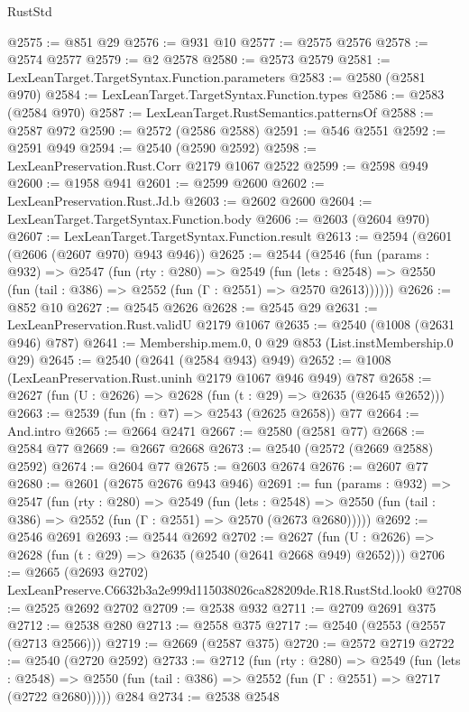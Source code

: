 \begin{lexlean}{RustStd}
\begin{coremodule}
@2575 := @851 @29
@2576 := @931 @10
@2577 := @2575 @2576
@2578 := @2574 @2577
@2579 := @2 @2578
@2580 := @2573 @2579
@2581 := LexLeanTarget.TargetSyntax.Function.parameters
@2583 := @2580 (@2581 @970)
@2584 := LexLeanTarget.TargetSyntax.Function.types
@2586 := @2583 (@2584 @970)
@2587 := LexLeanTarget.RustSemantics.patternsOf
@2588 := @2587 @972
@2590 := @2572 (@2586 @2588)
@2591 := @546 @2551
@2592 := @2591 @949
@2594 := @2540 (@2590 @2592)
@2598 := LexLeanPreservation.Rust.Corr @2179 @1067 @2522
@2599 := @2598 @949
@2600 := @1958 @941
@2601 := @2599 @2600
@2602 := LexLeanPreservation.Rust.Jd.b
@2603 := @2602 @2600
@2604 := LexLeanTarget.TargetSyntax.Function.body
@2606 := @2603 (@2604 @970)
@2607 := LexLeanTarget.TargetSyntax.Function.result
@2613 := @2594 (@2601 (@2606 (@2607 @970) @943 @946))
@2625 := @2544
    (@2546
      (fun (params : @932) =>
      @2547
        (fun (rty : @280) =>
        @2549
          (fun (lets : @2548) =>
          @2550 (fun (tail : @386) => @2552 (fun (Γ : @2551) => @2570 @2613))))))
@2626 := @852 @10
@2627 := @2545 @2626
@2628 := @2545 @29
@2631 := LexLeanPreservation.Rust.validU @2179 @1067
@2635 := @2540 (@1008 (@2631 @946) @787)
@2641 := Membership.mem.{0, 0} @29 @853 (List.instMembership.{0} @29)
@2645 := @2540 (@2641 (@2584 @943) @949)
@2652 := @1008 (LexLeanPreservation.Rust.uninh @2179 @1067 @946 @949) @787
@2658 := @2627 (fun (U : @2626) => @2628 (fun (t : @29) => @2635 (@2645 @2652)))
@2663 := @2539 (fun (fn : @7) => @2543 (@2625 @2658)) @77
@2664 := And.intro
@2665 := @2664 @2471
@2667 := @2580 (@2581 @77)
@2668 := @2584 @77
@2669 := @2667 @2668
@2673 := @2540 (@2572 (@2669 @2588) @2592)
@2674 := @2604 @77
@2675 := @2603 @2674
@2676 := @2607 @77
@2680 := @2601 (@2675 @2676 @943 @946)
@2691 := fun (params : @932) =>
  @2547
    (fun (rty : @280) =>
    @2549
      (fun (lets : @2548) =>
      @2550 (fun (tail : @386) => @2552 (fun (Γ : @2551) => @2570 (@2673 @2680)))))
@2692 := @2546 @2691
@2693 := @2544 @2692
@2702 := @2627 (fun (U : @2626) => @2628 (fun (t : @29) => @2635 (@2540 (@2641 @2668 @949) @2652)))
@2706 := @2665 (@2693 @2702) LexLeanPreserve.C6632b3a2e999d115038026ca828209de.R18.RustStd.look0
@2708 := @2525 @2692 @2702
@2709 := @2538 @932
@2711 := @2709 @2691 @375
@2712 := @2538 @280
@2713 := @2558 @375
@2717 := @2540 (@2553 (@2557 (@2713 @2566)))
@2719 := @2669 (@2587 @375)
@2720 := @2572 @2719
@2722 := @2540 (@2720 @2592)
@2733 := @2712
    (fun (rty : @280) =>
    @2549
      (fun (lets : @2548) =>
      @2550 (fun (tail : @386) => @2552 (fun (Γ : @2551) => @2717 (@2722 @2680)))))
    @284
@2734 := @2538 @2548

\end{coremodule}
\end{lexlean}
